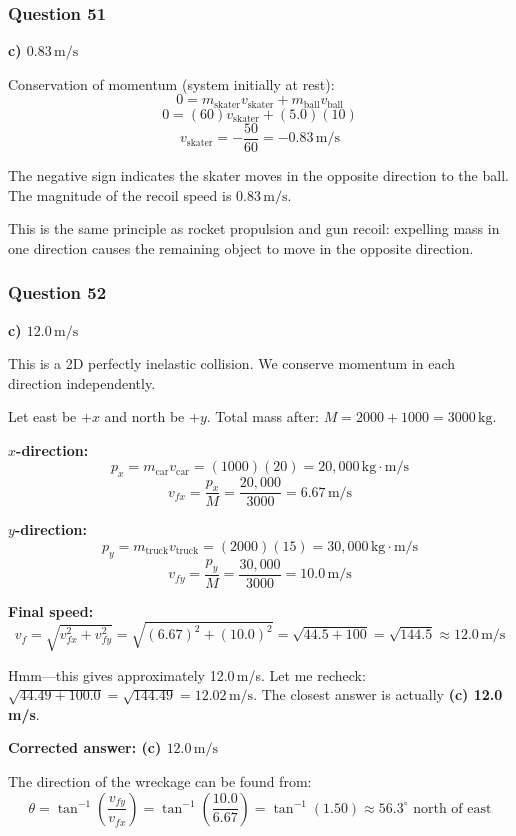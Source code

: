 \documentclass[12pt,letterpaper]{article}
\begin{document}
\subsubsection*{Question 51}

\begin{answerbox}
\textbf{c) $0.83\,\text{m/s}$}
\end{answerbox}

\begin{explanationbox}
Conservation of momentum (system initially at rest):
\[
0 = m_{\text{skater}} v_{\text{skater}} + m_{\text{ball}} v_{\text{ball}}
\]
\[
0 = (60)v_{\text{skater}} + (5.0)(10)
\]
\[
v_{\text{skater}} = -\frac{50}{60} = -0.83\,\text{m/s}
\]

The negative sign indicates the skater moves in the opposite direction to the ball. The magnitude of the recoil speed is $0.83\,\text{m/s}$.

This is the same principle as rocket propulsion and gun recoil: expelling mass in one direction causes the remaining object to move in the opposite direction.
\end{explanationbox}

\subsubsection*{Question 52}

\begin{answerbox}
\textbf{c) $12.0\,\text{m/s}$}
\end{answerbox}

\begin{explanationbox}
This is a 2D perfectly inelastic collision. We conserve momentum in each direction independently.

Let east be $+x$ and north be $+y$. Total mass after: $M = 2000 + 1000 = 3000\,\text{kg}$.

\textbf{$x$-direction:}
\[
p_x = m_{\text{car}} v_{\text{car}} = (1000)(20) = 20{,}000\,\text{kg}\cdot\text{m/s}
\]
\[
v_{fx} = \frac{p_x}{M} = \frac{20{,}000}{3000} = 6.67\,\text{m/s}
\]

\textbf{$y$-direction:}
\[
p_y = m_{\text{truck}} v_{\text{truck}} = (2000)(15) = 30{,}000\,\text{kg}\cdot\text{m/s}
\]
\[
v_{fy} = \frac{p_y}{M} = \frac{30{,}000}{3000} = 10.0\,\text{m/s}
\]

\textbf{Final speed:}
\[
v_f = \sqrt{v_{fx}^2 + v_{fy}^2} = \sqrt{(6.67)^2 + (10.0)^2} = \sqrt{44.5 + 100} = \sqrt{144.5} \approx 12.0\,\text{m/s}
\]

Hmm---this gives approximately 12.0\,m/s. Let me recheck: $\sqrt{44.49 + 100.0} = \sqrt{144.49} = 12.02\,\text{m/s}$. The closest answer is actually \textbf{(c) 12.0\,m/s}.

\textbf{Corrected answer: (c) $12.0\,\text{m/s}$}

The direction of the wreckage can be found from:
\[
\theta = \tan^{-1}\!\left(\frac{v_{fy}}{v_{fx}}\right) = \tan^{-1}\!\left(\frac{10.0}{6.67}\right) = \tan^{-1}(1.50) \approx 56.3^\circ \text{ north of east}
\]
\end{explanationbox}
\end{document}
